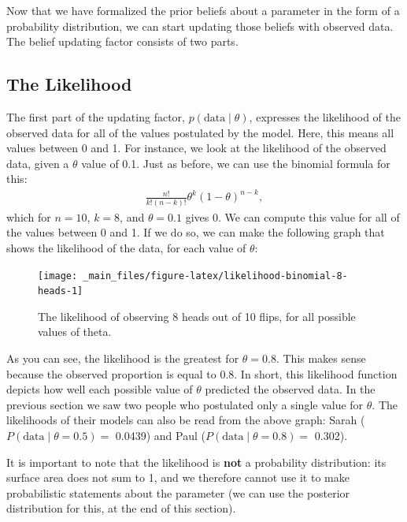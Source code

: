 \documentclass[
]{book}
\begin{document}
Now that we have formalized the prior beliefs about a parameter in the form of a probability distribution, we can start updating those beliefs with observed data. The belief updating factor consists of two parts.

\hypertarget{the-likelihood}{%
\subsection{The Likelihood}\label{the-likelihood}}

The first part of the updating factor, \(p( \text{data} \mid \theta)\), expresses the likelihood of the observed data for all of the values postulated by the model. Here, this means all values between 0 and 1. For instance, we look at the likelihood of the observed data, given a \(\theta\) value of 0.1. Just as before, we can use the binomial formula for this:
\begin{align} 
\label{binomFormulaTwo}
\frac{n!}{k! (n-k)!} \theta^k\left(1-\theta\right)^{n-k},
\end{align}
which for \(n = 10\), \(k = 8\), and \(\theta = 0.1\) gives 0. We can compute this value for all of the values between 0 and 1. If we do so, we can make the following graph that shows the likelihood of the data, for each value of \(\theta\):

\begin{figure}

{\centering \texttt{[image: \_main\_files/figure-latex/likelihood-binomial-8-heads-1]} 

}

\caption{The likelihood of observing 8 heads out of 10 flips, for all possible values of theta.}\label{fig:likelihood-binomial-8-heads}
\end{figure}

As you can see, the likelihood is the greatest for \(\theta = 0.8\). This makes sense because the observed proportion is equal to \(0.8\). In short, this likelihood function depicts how well each possible value of \(\theta\) predicted the observed data. In the previous section we saw two people who postulated only a single value for \(\theta\). The likelihoods of their models can also be read from the above graph: Sarah (\(P(\text{data} \mid \theta = 0.5) =\) 0.0439) and Paul (\(P(\text{data} \mid \theta = 0.8) =\) 0.302).

It is important to note that the likelihood is \textbf{not} a probability distribution: its surface area does not sum to 1, and we therefore cannot use it to make probabilistic statements about the parameter (we can use the posterior distribution for this, at the end of this section).
\end{document}
